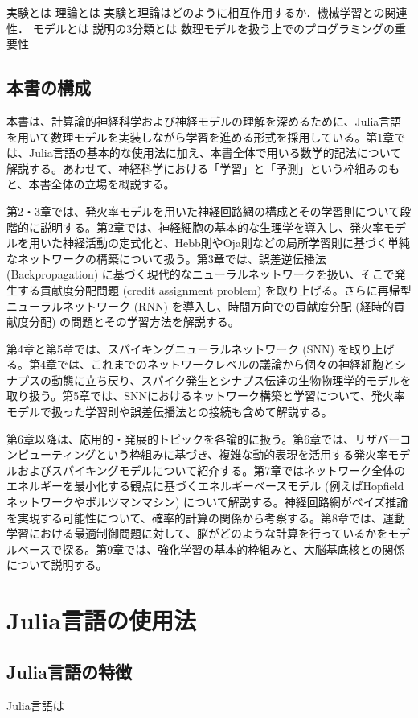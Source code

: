 \documentclass[titlepage]{ltjsbook}
\begin{document}
実験とは
理論とは
実験と理論はどのように相互作用するか．機械学習との関連性．
モデルとは
説明の3分類とは
数理モデルを扱う上でのプログラミングの重要性

\subsection{本書の構成}
本書は、計算論的神経科学および神経モデルの理解を深めるために、Julia言語を用いて数理モデルを実装しながら学習を進める形式を採用している。第1章では、Julia言語の基本的な使用法に加え、本書全体で用いる数学的記法について解説する。あわせて、神経科学における「学習」と「予測」という枠組みのもと、本書全体の立場を概説する。

第2・3章では、発火率モデルを用いた神経回路網の構成とその学習則について段階的に説明する。第2章では、神経細胞の基本的な生理学を導入し、発火率モデルを用いた神経活動の定式化と、Hebb則やOja則などの局所学習則に基づく単純なネットワークの構築について扱う。第3章では、誤差逆伝播法 (Backpropagation) に基づく現代的なニューラルネットワークを扱い、そこで発生する貢献度分配問題 (credit assignment problem) を取り上げる。さらに再帰型ニューラルネットワーク (RNN) を導入し、時間方向での貢献度分配 (経時的貢献度分配) の問題とその学習方法を解説する。

第4章と第5章では、スパイキングニューラルネットワーク (SNN) を取り上げる。第4章では、これまでのネットワークレベルの議論から個々の神経細胞とシナプスの動態に立ち戻り、スパイク発生とシナプス伝達の生物物理学的モデルを取り扱う。第5章では、SNNにおけるネットワーク構築と学習について、発火率モデルで扱った学習則や誤差伝播法との接続も含めて解説する。

第6章以降は、応用的・発展的トピックを各論的に扱う。第6章では、リザバーコンピューティングという枠組みに基づき、複雑な動的表現を活用する発火率モデルおよびスパイキングモデルについて紹介する。第7章ではネットワーク全体のエネルギーを最小化する観点に基づくエネルギーベースモデル (例えばHopfieldネットワークやボルツマンマシン) について解説する。神経回路網がベイズ推論を実現する可能性について、確率的計算の関係から考察する。第8章では、運動学習における最適制御問題に対して、脳がどのような計算を行っているかをモデルベースで探る。第9章では、強化学習の基本的枠組みと、大脳基底核との関係について説明する。

\section{Julia言語の使用法}
\subsection{Julia言語の特徴}
Julia言語は
\end{document}
